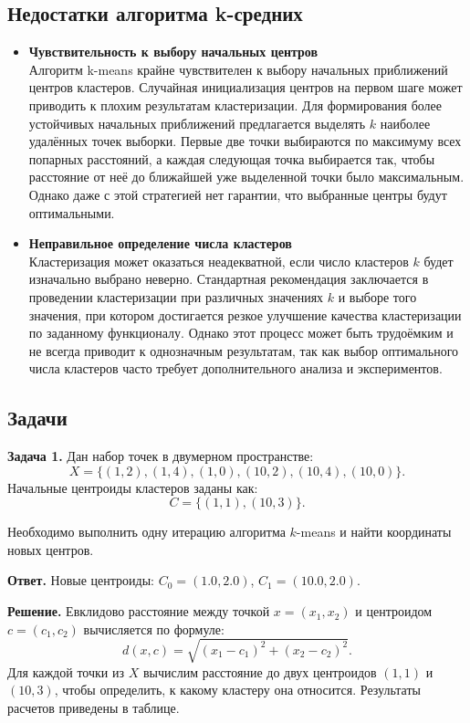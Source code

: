 \subsection{Недостатки алгоритма k-средних}
\begin{itemize}
    \item \textbf{Чувствительность к выбору начальных центров} \\
          Алгоритм k-means крайне чувствителен к выбору начальных приближений центров кластеров. Случайная инициализация центров на первом шаге может приводить к плохим результатам кластеризации. Для формирования более устойчивых начальных приближений предлагается выделять \( k \) наиболее удалённых точек выборки. Первые две точки выбираются по максимуму всех попарных расстояний, а каждая следующая точка выбирается так, чтобы расстояние от неё до ближайшей уже выделенной точки было максимальным. Однако даже с этой стратегией нет гарантии, что выбранные центры будут оптимальными.
    \item \textbf{Неправильное определение числа кластеров} \\
          Кластеризация может оказаться неадекватной, если число кластеров \( k \) будет изначально выбрано неверно. Стандартная рекомендация заключается в проведении кластеризации при различных значениях \( k \) и выборе того значения, при котором достигается резкое улучшение качества кластеризации по заданному функционалу. Однако этот процесс может быть трудоёмким и не всегда приводит к однозначным результатам, так как выбор оптимального числа кластеров часто требует дополнительного анализа и экспериментов.
\end{itemize}

\subsection{Задачи}
\textbf{Задача 1.} Дан набор точек в двумерном пространстве:
\[
    X = \{(1, 2), (1, 4), (1, 0), (10, 2), (10, 4), (10, 0)\}.
\]
Начальные центроиды кластеров заданы как:
\[
    C = \{(1, 1), (10, 3)\}.
\]

Необходимо выполнить одну итерацию алгоритма \(k\)-means и найти координаты новых центров.

\textbf{Ответ. }Новые центроиды: \(C_0 = (1.0, 2.0)\), \(C_1 = (10.0, 2.0)\).

\textbf{Решение.}
Евклидово расстояние между точкой \(x = (x_1, x_2)\) и центроидом \(c = (c_1, c_2)\) вычисляется по формуле:
\[
    d(x, c) = \sqrt{(x_1 - c_1)^2 + (x_2 - c_2)^2}.
\]
Для каждой точки из \(X\) вычислим расстояние до двух центроидов \((1, 1)\) и \((10, 3)\), чтобы определить, к какому кластеру она относится. Результаты расчетов приведены в таблице.

